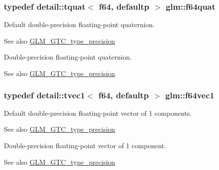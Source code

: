 \subsubsection[{\texorpdfstring{f64quat}{f64quat}}]{\setlength{\rightskip}{0pt plus 5cm}typedef detail\+::tquat$<$ f64, defaultp $>$ {\bf glm\+::f64quat}}\hypertarget{group__gtc__type__precision_ga860589eddc4ff95795a858318652b6ff}{}\label{group__gtc__type__precision_ga860589eddc4ff95795a858318652b6ff}
Default double-\/precision floating-\/point quaternion. \begin{DoxySeeAlso}{See also}
\hyperlink{group__gtc__type__precision}{G\+L\+M\+\_\+\+G\+T\+C\+\_\+type\+\_\+precision}
\end{DoxySeeAlso}
Double-\/precision floating-\/point quaternion. \begin{DoxySeeAlso}{See also}
\hyperlink{group__gtc__type__precision}{G\+L\+M\+\_\+\+G\+T\+C\+\_\+type\+\_\+precision} 
\end{DoxySeeAlso}
\subsubsection[{\texorpdfstring{f64vec1}{f64vec1}}]{\setlength{\rightskip}{0pt plus 5cm}typedef detail\+::tvec1$<$ f64, defaultp $>$ {\bf glm\+::f64vec1}}\hypertarget{group__gtc__type__precision_ga55bdb96a24de2e3531c74310b12ba5d7}{}\label{group__gtc__type__precision_ga55bdb96a24de2e3531c74310b12ba5d7}
Default double-\/precision floating-\/point vector of 1 components. \begin{DoxySeeAlso}{See also}
\hyperlink{group__gtc__type__precision}{G\+L\+M\+\_\+\+G\+T\+C\+\_\+type\+\_\+precision}
\end{DoxySeeAlso}
Double-\/precision floating-\/point vector of 1 component. \begin{DoxySeeAlso}{See also}
\hyperlink{group__gtc__type__precision}{G\+L\+M\+\_\+\+G\+T\+C\+\_\+type\+\_\+precision} 
\end{DoxySeeAlso}
